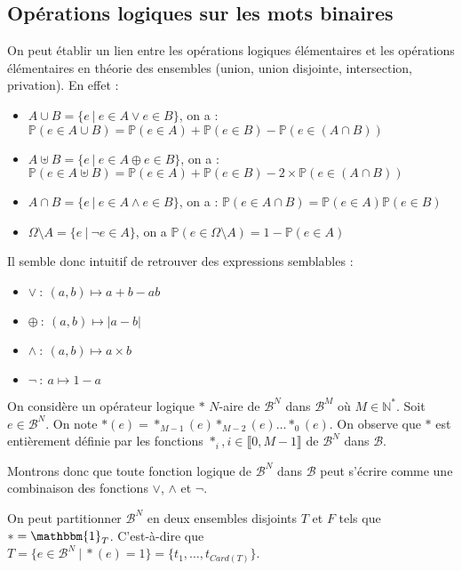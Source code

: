 \documentclass[../main.tex]{subfiles}
\begin{document}
\subsection{Opérations logiques sur les mots binaires}
 On peut établir un lien entre les opérations logiques élémentaires et les opérations élémentaires en théorie des ensembles (union, union disjointe, intersection, privation). En effet :
\begin{itemize}
	\item $A\cup{B} = \{e\ |\ e\in{A}\vee e\in{B}\}$, on a : $\mathbb{P}(e\in A\cup{B}) = \mathbb{P}(e\in A) + \mathbb{P}(e\in B) - \mathbb{P}(e\in (A\cap B))$
	\item $A\uplus{B} = \{e\ |\ e\in{A}\oplus e\in{B}\}$, on a : $\mathbb{P}(e\in A\uplus{B}) = \mathbb{P}(e\in A) + \mathbb{P}(e\in B) - 2\times\mathbb{P}(e\in (A\cap B))$
	\item $A\cap{B} = \{e\ |\ e\in{A}\wedge e\in{B}\}$, on a : $\mathbb{P}(e\in A\cap{B}) = \mathbb{P}(e\in A)\mathbb{P}(e\in B)$
	\item $\Omega\setminus{A} = \{e\ |\ \neg e\in{A}\}$, on a $\mathbb{P}(e\in{\Omega\setminus{A}}) = 1 - \mathbb{P}(e\in{A})$
\end{itemize}
Il semble donc intuitif de retrouver des expressions semblables :
\begin{itemize}
	\item $\vee\ :\ (a, b) \mapsto a + b - ab$
	\item $\oplus\ :\ (a, b) \mapsto |a - b|$
	\item $\wedge\ :\ (a, b) \mapsto a\times b$
	\item $\neg\ :\ a \mapsto 1 - a$
\end{itemize}
On considère un opérateur logique $\ast$ $N$-aire de $\mathcal{B}^{N}$ dans $\mathcal{B}^{M}$ où $M\in{\mathbb{N}^{*}}$. Soit $e\in{\mathcal{B}^{N}}$. On note $\ast(e) = \ast_{M-1}(e)\ast_{M-2}(e)\dots\ast_{0}(e)$. On observe que $\ast$ est entièrement définie par les fonctions $\ast_{i}, i\in{\llbracket0, M-1\rrbracket}$ de $\mathcal{B}^{N}$ dans $\mathcal{B}$.

Montrons donc que toute fonction logique de $\mathcal{B}^{N}$ dans $\mathcal{B}$ peut s'écrire comme une combinaison des fonctions $\vee$, $\wedge$ et $\neg$.

On peut partitionner $\mathcal{B}^{N}$ en deux ensembles disjoints $T$ et $F$ tels que $\ast = \mathbbm{1}_{T}$. C'est-à-dire que $T = \{e\in\mathcal{B}^{N}\ |\ \ast(e) = 1\} = \{t_{1}, \dots, t_{Card(T)}\}$.
\end{document}
